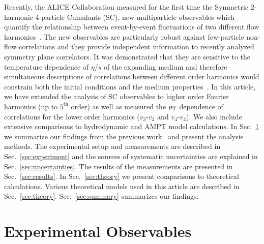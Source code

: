 Recently, the ALICE Collaboration measured for the first time the Symmetric 2-harmonic 4-particle Cumulants (SC), new multiparticle observables which quantify the relationship between event-by-event fluctuations of two different flow harmonics~\cite{ALICE:2016kpq}. 
The new observables are particularly robust against few-particle non-flow correlations and they provide independent information to recently analyzed symmetry plane correlators. 
It was demonstrated that they are sensitive to the temperature dependence of $\eta/s$ of the expanding medium and therefore simultaneous descriptions of correlations between different order harmonics would constrain both the initial conditions and the medium properties~\cite{ALICE:2016kpq,Zhu:2016puf}.
In this article, we have extended the analysis of SC observables to higher order Fourier harmonics (up to $5^{\mathrm{th}}$ order) as well as measured the $p_{\rm T}$ dependence of correlations for the lower order harmonics ($v_3$-$v_2$ and $v_4$-$v_2$).  We also include extensive comparisons to hydrodynamic and AMPT model calculations.
In Sec.~\ref{sec:method} we summarize our findings from the previous work~\cite{ALICE:2016kpq} and present the analysis methods. The experimental setup and measurements are described in Sec.~\ref{sec:experiment} and the sources of systematic uncertainties are explained in Sec.~\ref{sec:uncertainties}. The results of the measurements are presented in Sec.~\ref{sec:results}. 
 In Sec.~\ref{sec:theory} we present comparisons to theoretical calculations. Various theoretical models used in this article are described in Sec.~\ref{sec:theory}. Sec.~\ref{sec:summary} summarizes our findings.
 
 

\section{Experimental Observables}
\label{sec:method}

